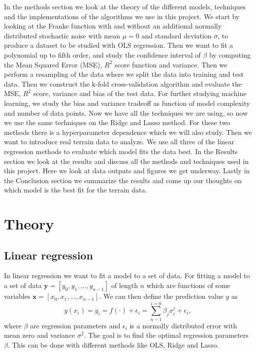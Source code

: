 \documentclass[12pt,a4paper,english]{article}
\begin{document}
In the methods section we look at the theory of the different models, techniques and the implementations of the algorithms we use in this project. We start by looking at the Franke function with and without an additional normally distributed stochastic noise with mean $\mu=0$ and standard deviation $\sigma$, to produce a dataset to be studied with OLS regression. Then we want to fit a polynomial up to fifth order, and study the confidence interval of $\beta$ by computing the Mean Squared Error (MSE), $R^2$ score function and variance. Then we perform a resampling of the data where we split the data into training and test data. Then we construct the k-fold cross-validation algorithm and evaluate the MSE, $R^2$ score, variance and bias of the test data. For further studying machine learning, we study the bias and variance tradeoff as function of model complexity and number of data points. Now we have all the techniques we are using, so now we use the same techniques on the Ridge and Lasso method. For these two methods there is a hyperparameter dependence which we will also study. Then we want to introduce real terrain data to analyze. We use all three of the linear regression methods to evaluate which model fits the data best. In the Results section we look at the results and discuss all the methods and techniques used in this project. Here we look at data outputs and figures we get underway. Lastly in the Conclusion section we summarize the results and come up our thoughts on which model is the best fit for the terrain data.

\section{Theory}
\subsection{Linear regression}
In linear regression we want to fit a model to a set of data. For fitting a model to a set of data $\textbf{y}=[y_0, y_1,...,y_{n-1}]$ of length $n$ which are functions of some variables $\textbf{x}=[x_0, x_1,...,x_{n-1}]$. We can then define the prediction value $y$ as
\begin{equation}
\label{eq:pred_y}
y(x_i)=y_i=f(\cdot)+\epsilon_i=\sum_{n-1}^{i=0}\beta_jx_i^j+\epsilon_i,
\end{equation}
where $\beta$ are regression parameters and $\epsilon_i$ is a normally distributed error with mean zero and variance $\sigma^2$. The goal is to find the optimal regression parameters $\beta$. This can be done with different methods like OLS, Ridge and Lasso.
\end{document}
